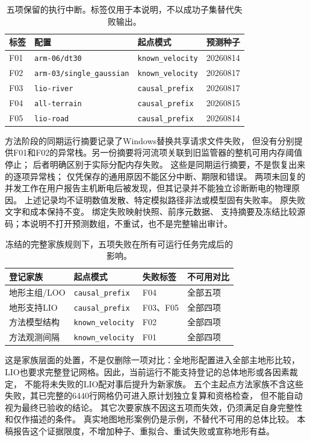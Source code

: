 \documentclass[UTF8,11pt]{ctexart}
\begin{document}
\begin{table}[htbp]
\centering\small
\caption{五项保留的执行中断。标签仅用于本说明，不以成功子集替代失败输出。}
\label{tab:retained-failures}
\begin{tabular}{llll}
\toprule
标签 & 配置 & 起点模式 & 预测种子\\
\midrule
F01 & \texttt{arm-06/dt30} & \texttt{known\_velocity} & 20260814\\
F02 & \texttt{arm-03/single\_gaussian} & \texttt{known\_velocity} & 20260817\\
F03 & \texttt{lio-river} & \texttt{causal\_prefix} & 20260817\\
F04 & \texttt{all-terrain} & \texttt{causal\_prefix} & 20260815\\
F05 & \texttt{lio-road} & \texttt{causal\_prefix} & 20260814\\
\bottomrule
\end{tabular}
\end{table}

方法阶段的同期运行摘要记录了Windows替换共享请求文件失败，
但没有分别提供F01和F02的异常栈。另一份摘要将河流项关联到旧监管器的整机可用内存阈值停止；
后者明确区别于实际分配内存失败。
这些是同期运行摘要，不是恢复出来的逐项异常栈；
仅凭保存的通用原因不能区分中断、期限和错误。
两项未回复的并发工作在用户报告主机断电后被发现，但其记录并不能独立诊断断电的物理原因。
上述记录均不证明数值发散、特定模拟路径非法或模型固有失败率。
原失败文字和成本保持不变。
 绑定失败映射快照、前序元数据、
支持摘要及冻结比较源码；本说明不打开预测数组，不重试，也不是完整输出审计。

\begin{table}[htbp]
\centering\small
\caption{冻结的完整家族规则下，五项失败在所有可运行任务完成后的影响。}
\label{tab:failure-family-dispositions}
\begin{tabular}{llll}
\toprule
登记家族 & 起点模式 & 失败标签 & 不可用对比\\
\midrule
地形主组/LOO & \texttt{causal\_prefix} & F04 & 全部五项\\
地形支持LIO & \texttt{causal\_prefix} & F03、F05 & 全部四项\\
方法模型结构 & \texttt{known\_velocity} & F02 & 全部四项\\
方法观测间隔 & \texttt{known\_velocity} & F01 & 全部四项\\
\bottomrule
\end{tabular}
\end{table}

这是家族层面的处置，不是仅删除一项对比：全地形配置进入全部主地形比较，
LIO也要求完整登记网格。因此，当前运行不能支持登记的总体地形或各因素裁定，
不能将未失败的LIO配对事后提升为新家族。
五个主起点方法家族不含这些失败，其已完整的6440行网格仍可进入原计划独立复算和资格检查，
但不能自动视为最终已验收的结论。
其它次要家族不因这五项而失效，仍须满足自身完整性和仅作描述的条件。
真实地图地形案例仍是示例，不替代不可用的总体比较。
本稿报告这个证据限度，不增加种子、重拟合、重试失败或宣称地形有益。
\end{document}
